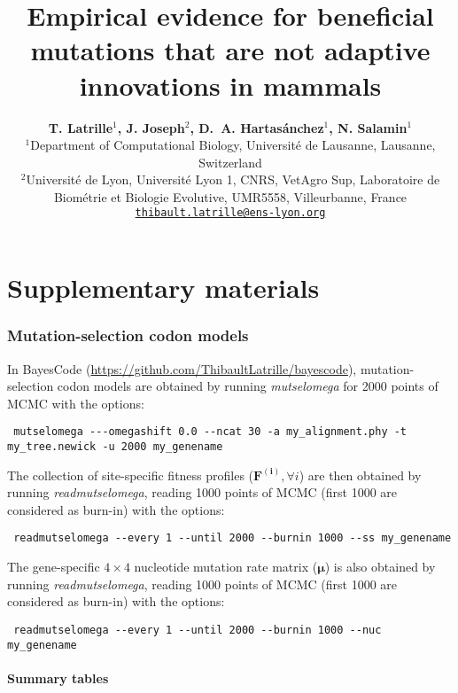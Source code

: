 \documentclass{article}
\title{\textbf{Empirical evidence for beneficial mutations that are not adaptive innovations in mammals}}
\author{
    \large
    \textbf{T. {Latrille}$^{1}$, J. {Joseph}$^{2}$, D.~A. {Hartasánchez}$^{1}$, N. {Salamin}$^{1}$}\\
    \scriptsize $^{1}$Department of Computational Biology, Université de Lausanne, Lausanne, Switzerland\\
    \scriptsize $^{2}$Université de Lyon, Université Lyon 1, CNRS, VetAgro Sup, Laboratoire de Biométrie et Biologie Evolutive, UMR5558, Villeurbanne, France \\
    \texttt{\href{mailto:thibault.latrille@ens-lyon.org}{thibault.latrille@ens-lyon.org}} \\
}
\date{}
\newcommand{\UniDimArray}[1]{\bm{#1}}
\begin{document}
    \maketitle
    \part*{Supplementary materials}
    \tableofcontents
    \clearpage

    \section{Mutation-selection codon models}\label{sec:site-specific-mutation-selection-codon-models}
    In BayesCode (\url{https://github.com/ThibaultLatrille/bayescode}), mutation-selection codon models are obtained by running \textit{mutselomega} for 2000 points of MCMC with the options:
    \begin{scriptsize}
        \begin{verbatim}
 mutselomega ---omegashift 0.0 --ncat 30 -a my_alignment.phy -t my_tree.newick -u 2000 my_genename
        \end{verbatim}
    \end{scriptsize}
    The collection of site-specific fitness profiles ($\UniDimArray{F^{(i)}}, \forall i$) are then obtained by running \textit{readmutselomega}, reading 1000 points of MCMC (first 1000 are considered as burn-in) with the options:
    \begin{scriptsize}
        \begin{verbatim}
 readmutselomega --every 1 --until 2000 --burnin 1000 --ss my_genename
        \end{verbatim}
    \end{scriptsize}
    The gene-specific $4 \times 4$ nucleotide mutation rate matrix ($\UniDimArray{\mu}$) is also obtained by running \textit{readmutselomega}, reading 1000 points of MCMC (first 1000 are considered as burn-in) with the options:
    \begin{scriptsize}
        \begin{verbatim}
 readmutselomega --every 1 --until 2000 --burnin 1000 --nuc my_genename
        \end{verbatim}
    \end{scriptsize}

    \subsection{Summary tables}\label{subsec:summary-table-mutsel}
\end{document}

